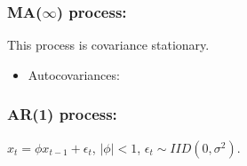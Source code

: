 \documentclass{article}
\begin{document}
\subsubsection{MA(\(\infty\)) process:} 

This process is covariance stationary.

\begin{itemize}

\item Autocovariances:

\end{itemize}


\subsubsection{AR(1) process:} \(x_t = \phi x_{t-1} + \epsilon_t\), \(|\phi| < 1\), \(\epsilon_t \sim IID(0, \sigma^2)\). 
\end{document}
